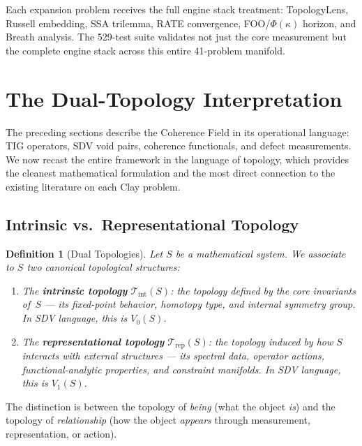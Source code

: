 \documentclass[11pt]{article}
\newtheorem{definition}[theorem]{Definition}
\begin{document}
\noindent
Each expansion problem receives the full engine stack treatment:
TopologyLens, Russell embedding, SSA trilemma, RATE convergence,
FOO/$\Phi(\kappa)$ horizon, and Breath analysis.  The 529-test suite
validates not just the core measurement but the complete engine stack
across this entire 41-problem manifold.

\section{The Dual-Topology Interpretation}
\label{sec:topology}

The preceding sections describe the Coherence Field in its operational
language: TIG operators, SDV void pairs, coherence functionals, and defect
measurements.  We now recast the entire framework in the language of topology,
which provides the cleanest mathematical formulation and the most direct
connection to the existing literature on each Clay problem.

\subsection{Intrinsic vs.\ Representational Topology}
\label{subsec:two-topologies}

\begin{definition}[Dual Topologies]
\label{def:dual-topo}
Let $S$ be a mathematical system.  We associate to $S$ two canonical
topological structures:
\begin{enumerate}
\item The \textbf{intrinsic topology} $\mathcal{T}_{\mathrm{int}}(S)$:
the topology defined by the core invariants of~$S$ --- its fixed-point
behavior, homotopy type, and internal symmetry group.  In SDV language,
this is $V_0(S)$.
\item The \textbf{representational topology} $\mathcal{T}_{\mathrm{rep}}(S)$:
the topology induced by how $S$ interacts with external structures ---
its spectral data, operator actions, functional-analytic properties,
and constraint manifolds.  In SDV language, this is $V_1(S)$.
\end{enumerate}
\end{definition}

\noindent
The distinction is between the topology of \emph{being} (what the object
\emph{is}) and the topology of \emph{relationship} (how the object
\emph{appears} through measurement, representation, or action).
\end{document}
